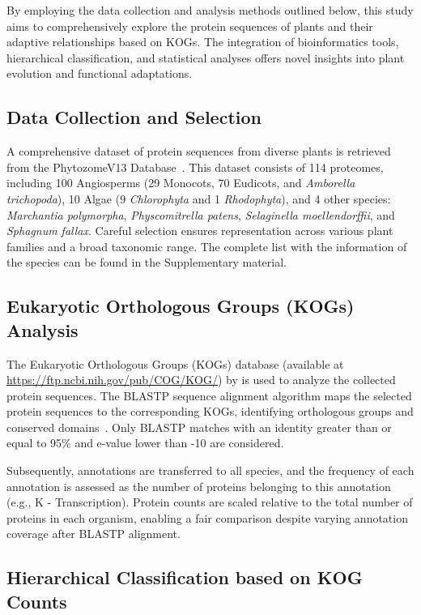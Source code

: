 By employing the data collection and analysis methods outlined 
below, this study aims to comprehensively explore the protein 
sequences of plants and their adaptive relationships based 
on KOGs. The integration of bioinformatics tools, hierarchical 
classification, and statistical analyses offers novel insights 
into plant evolution and functional adaptations.


\subsection{Data Collection and Selection}
\label{sec:method.data}

A comprehensive dataset of protein sequences from diverse plants 
is retrieved from the PhytozomeV13 Database~\citep{goodstein2011}.
This dataset consists of 114 proteomes, including 100 
Angiosperms (29 Monocots, 70 Eudicots, and \emph{Amborella 
trichopoda}), 10 Algae (9 \emph{Chlorophyta} and 1 
\emph{Rhodophyta}), and 4 other species: \emph{Marchantia 
polymorpha}, \emph{Physcomitrella patens}, \emph{Selaginella 
moellendorffii}, and \emph{Sphagnum fallax}. Careful selection 
ensures representation across various plant families and a 
broad taxonomic range. The complete list with the information 
of the species can be found in the Supplementary material.


\subsection{Eukaryotic Orthologous Groups (KOGs) Analysis}
\label{sec:method.kog}

The Eukaryotic Orthologous Groups (KOGs) database (available at
\url{https://ftp.ncbi.nih.gov/pub/COG/KOG/}) 
by \cite{tatusov2003} is used to analyze the collected protein 
sequences. The BLASTP sequence alignment algorithm maps the 
selected protein sequences to the corresponding KOGs, 
identifying orthologous groups and conserved 
domains~\citep{camacho2009}. Only BLASTP matches with an 
identity greater than or equal to 95\% and e-value lower 
than -10 are considered.

Subsequently, annotations are transferred to all species, 
and the frequency of each annotation is assessed as the 
number of proteins belonging to this annotation (e.g., K - 
Transcription). Protein counts are scaled relative to the 
total number of proteins in each organism, enabling a 
fair comparison despite varying annotation coverage after 
BLASTP alignment.


\subsection{Hierarchical Classification based on KOG Counts}
\label{sec:method.hierarchy}

